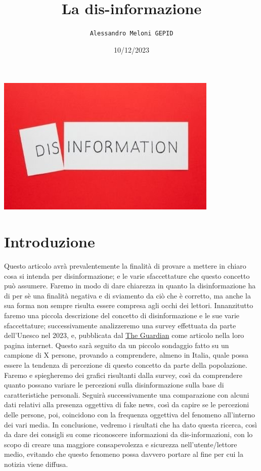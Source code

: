 \documentclass{article}
\title{\textbf{La dis-informazione}}
\author{\texttt{Alessandro Meloni GEPID}}
\date{10/12/2023}
\begin{document}
\maketitle
    \includegraphics[width = 0.6\linewidth]{Immagini/disinformation.jpeg}
\centering \tableofcontents
\newpage \section{Introduzione}
\flushleft
\begin{justify}
    Questo articolo avrà prevalentemente la finalità di provare a mettere in chiaro cosa si intenda per disinformazione; e le varie sfaccettature che questo concetto può assumere.
    Faremo in modo di dare chiarezza in quanto la disinformazione ha di per sè una finalità negativa e di sviamento da ciò che è corretto, ma anche la sua forma non sempre risulta essere compresa agli occhi dei lettori.
    Innanzitutto faremo una piccola descrizione del concetto di disinformazione e le sue varie sfaccettature; successivamente analizzeremo una survey effettuata da parte dell'Unesco nel 2023, e, pubblicata dal \href{https://www.theguardian.com/technology/2023/nov/07/85-of-people-worry-about-online-disinformation-global-survey-finds}{The Guardian}\label{:articolo} come articolo nella loro pagina internet. Questo sarà seguito da un piccolo sondaggio fatto su un campione di X persone, provando a comprendere, almeno in Italia, quale possa essere la tendenza di percezione di questo concetto da parte della popolazione.
    Faremo e spiegheremo dei grafici risultanti dalla survey, così da comprendere quanto possano variare le percezioni sulla disinformazione sulla base di caratteristiche personali. 
    Seguirà successivamente una comparazione con alcuni dati relativi alla presenza oggettiva di fake news, così da capire se le percezioni delle persone, poi, coincidono con la frequenza oggettiva del fenomeno all'interno dei vari media.
    In conclusione, vedremo i risultati che ha dato questa ricerca, così da dare dei consigli su come riconoscere informazioni da dis-informazioni, con lo scopo di creare una maggiore consapevolezza e sicurezza nell'utente/lettore medio, evitando che questo fenomeno possa davvero portare al fine per cui la notizia viene diffusa.
    
\end{justify}
\end{document}
